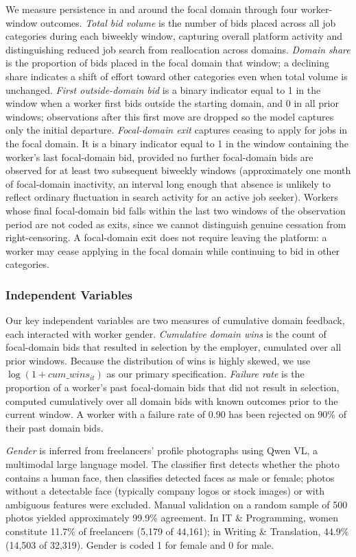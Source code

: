 \documentclass[12pt]{article}
\begin{document}
We measure persistence in and around the focal domain through four worker-window outcomes. \textit{Total bid volume} is the number of bids placed across all job categories during each biweekly window, capturing overall platform activity and distinguishing reduced job search from reallocation across domains. \textit{Domain share} is the proportion of bids placed in the focal domain that window; a declining share indicates a shift of effort toward other categories even when total volume is unchanged. \textit{First outside-domain bid} is a binary indicator equal to 1 in the window when a worker first bids outside the starting domain, and 0 in all prior windows; observations after this first move are dropped so the model captures only the initial departure. \textit{Focal-domain exit} captures ceasing to apply for jobs in the focal domain. It is a binary indicator equal to 1 in the window containing the worker's last focal-domain bid, provided no further focal-domain bids are observed for at least two subsequent biweekly windows (approximately one month of focal-domain inactivity, an interval long enough that absence is unlikely to reflect ordinary fluctuation in search activity for an active job seeker). Workers whose final focal-domain bid falls within the last two windows of the observation period are not coded as exits, since we cannot distinguish genuine cessation from right-censoring. A focal-domain exit does not require leaving the platform: a worker may cease applying in the focal domain while continuing to bid in other categories.

\subsubsection{Independent Variables}

Our key independent variables are two measures of cumulative domain feedback, each interacted with worker gender. \textit{Cumulative domain wins} is the count of focal-domain bids that resulted in selection by the employer, cumulated over all prior windows. Because the distribution of wins is highly skewed, we use $\log(1 + cum\_wins_{it})$ as our primary specification. \textit{Failure rate} is the proportion of a worker's past focal-domain bids that did not result in selection, computed cumulatively over all domain bids with known outcomes prior to the current window. A worker with a failure rate of 0.90 has been rejected on 90\% of their past domain bids.

\textit{Gender} is inferred from freelancers' profile photographs using Qwen VL, a multimodal large language model. The classifier first detects whether the photo contains a human face, then classifies detected faces as male or female; photos without a detectable face (typically company logos or stock images) or with ambiguous features were excluded. Manual validation on a random sample of 500 photos yielded approximately 99.9\% agreement. In IT \& Programming, women constitute 11.7\% of freelancers (5,179 of 44,161); in Writing \& Translation, 44.9\% (14,503 of 32,319). Gender is coded 1 for female and 0 for male.
\end{document}
